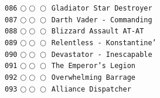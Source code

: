 \documentclass[a4paper,landscape]{article}
\begin{document}
\begin{multicols*}{5}
\texttt{086} \(\bigcirc\!\bigcirc\!\bigcirc\)  \texttt{Gladiator Star Destroyer} \vspace{-0.3mm}\\ 
\texttt{087} \(\bigcirc\!\bigcirc\!\bigcirc\)  \texttt{Darth Vader - Commanding } \vspace{-0.3mm}\\ 
\texttt{088} \(\bigcirc\!\bigcirc\!\bigcirc\)  \texttt{Blizzard Assault AT-AT} \vspace{-0.3mm}\\ 
\texttt{089} \(\bigcirc\!\bigcirc\!\bigcirc\)  \texttt{Relentless - Konstantine'} \vspace{-0.3mm}\\ 
\texttt{090} \(\bigcirc\!\bigcirc\!\bigcirc\)  \texttt{Devastator - Inescapable} \vspace{-0.3mm}\\ 
\texttt{091} \(\bigcirc\!\bigcirc\!\bigcirc\)  \texttt{The Emperor's Legion} \vspace{-0.3mm}\\ 
\texttt{092} \(\bigcirc\!\bigcirc\!\bigcirc\)  \texttt{Overwhelming Barrage} \vspace{-0.3mm}\\ 
\texttt{093} \(\bigcirc\!\bigcirc\!\bigcirc\)  \texttt{Alliance Dispatcher} \vspace{-0.3mm}\\ 

\end{multicols*}
\end{document}
